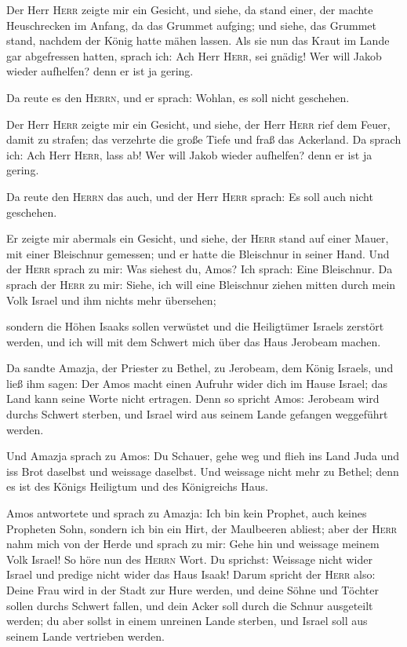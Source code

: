  Der Herr \textsc{Herr} zeigte mir ein Gesicht, und siehe,
da stand einer, der machte Heuschrecken im Anfang, da das Grummet
aufging; und siehe, das Grummet stand, nachdem der König hatte mähen
lassen.  Als sie nun das Kraut im Lande gar abgefressen
hatten, sprach ich: Ach Herr \textsc{Herr}, sei gnädig! Wer will Jakob
wieder aufhelfen? denn er ist ja gering.

 Da reute es den \textsc{Herrn}, und er sprach: Wohlan, es
soll nicht geschehen.

 Der Herr \textsc{Herr} zeigte mir ein Gesicht, und siehe,
der Herr \textsc{Herr} rief dem Feuer, damit zu strafen; das verzehrte
die große Tiefe und fraß das Ackerland.  Da sprach ich:
Ach Herr \textsc{Herr}, lass ab! Wer will Jakob wieder aufhelfen? denn
er ist ja gering.

 Da reute den \textsc{Herrn} das auch, und der Herr
\textsc{Herr} sprach: Es soll auch nicht geschehen.

 Er zeigte mir abermals ein Gesicht, und siehe, der
\textsc{Herr} stand auf einer Mauer, mit einer Bleischnur gemessen; und
er hatte die Bleischnur in seiner Hand.  Und der
\textsc{Herr} sprach zu mir: Was siehest du, Amos? Ich sprach: Eine
Bleischnur. Da sprach der \textsc{Herr} zu mir: Siehe, ich will eine
Bleischnur ziehen mitten durch mein Volk Israel und ihm nichts mehr
übersehen;

 sondern die Höhen Isaaks sollen verwüstet und die
Heiligtümer Israels zerstört werden, und ich will mit dem Schwert mich
über das Haus Jerobeam machen.

 Da sandte Amazja, der Priester zu Bethel, zu Jerobeam,
dem König Israels, und ließ ihm sagen: Der Amos macht einen Aufruhr
wider dich im Hause Israel; das Land kann seine Worte nicht ertragen.
 Denn so spricht Amos: Jerobeam wird durchs Schwert
sterben, und Israel wird aus seinem Lande gefangen weggeführt werden.

 Und Amazja sprach zu Amos: Du Schauer, gehe weg und
flieh ins Land Juda und iss Brot daselbst und weissage daselbst.
 Und weissage nicht mehr zu Bethel; denn es ist des
Königs Heiligtum und des Königreichs Haus.

 Amos antwortete und sprach zu Amazja: Ich bin kein
Prophet, auch keines Propheten Sohn, sondern ich bin ein Hirt, der
Maulbeeren abliest;  aber der \textsc{Herr} nahm mich von
der Herde und sprach zu mir: Gehe hin und weissage meinem Volk Israel!
 So höre nun des \textsc{Herrn} Wort. Du sprichst:
Weissage nicht wider Israel und predige nicht wider das Haus Isaak!
 Darum spricht der \textsc{Herr} also: Deine Frau wird in
der Stadt zur Hure werden, und deine Söhne und Töchter sollen durchs
Schwert fallen, und dein Acker soll durch die Schnur ausgeteilt werden;
du aber sollst in einem unreinen Lande sterben, und Israel soll aus
seinem Lande vertrieben werden.

